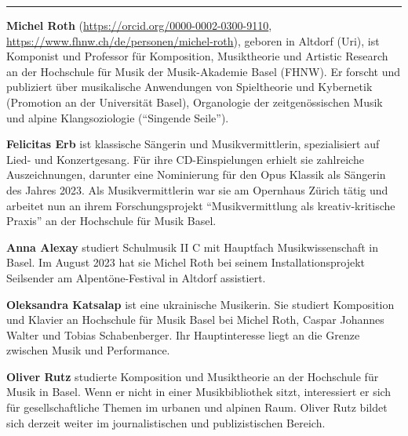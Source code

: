 \begin{center}\rule{0.5\linewidth}{0.5pt}\end{center}

\textbf{Michel Roth} (\url{https://orcid.org/0000-0002-0300-9110},
\url{https://www.fhnw.ch/de/personen/michel-roth}), geboren in Altdorf
(Uri), ist Komponist und Professor für Komposition, Musiktheorie und
Artistic Research an der Hochschule für Musik der Musik-Akademie Basel
(FHNW). Er forscht und publiziert über musikalische Anwendungen von
Spieltheorie und Kybernetik (Promotion an der Universität Basel),
Organologie der zeitgenössischen Musik und alpine Klangsoziologie
(``Singende Seile'').

\textbf{Felicitas Erb} ist klassische Sängerin und Musikvermittlerin,
spezialisiert auf Lied- und Konzertgesang. Für ihre CD-Einspielungen
erhielt sie zahlreiche Auszeichnungen, darunter eine Nominierung für den
Opus Klassik als Sängerin des Jahres 2023. Als Musikvermittlerin war sie
am Opernhaus Zürich tätig und arbeitet nun an ihrem Forschungsprojekt
``Musikvermittlung als kreativ-kritische Praxis'' an der Hochschule für
Musik Basel.

\textbf{Anna Alexay} studiert Schulmusik II C mit Hauptfach
Musikwissenschaft in Basel. Im August 2023 hat sie Michel Roth bei
seinem Installationsprojekt Seilsender am Alpentöne-Festival in Altdorf
assistiert.

\textbf{Oleksandra Katsalap} ist eine ukrainische Musikerin. Sie
studiert Komposition und Klavier an Hochschule für Musik Basel bei
Michel Roth, Caspar Johannes Walter und Tobias Schabenberger. Ihr
Hauptinteresse liegt an die Grenze zwischen Musik und Performance.

\textbf{Oliver Rutz} studierte Komposition und Musiktheorie an der
Hochschule für Musik in Basel. Wenn er nicht in einer Musikbibliothek
sitzt, interessiert er sich für gesellschaftliche Themen im urbanen und
alpinen Raum. Oliver Rutz bildet sich derzeit weiter im journalistischen
und publizistischen Bereich.
